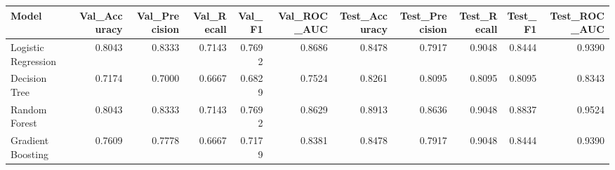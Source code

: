 \begin{tabular}{lrrrrrrrrrr}
\toprule
Model & Val_Accuracy & Val_Precision & Val_Recall & Val_F1 & Val_ROC_AUC & Test_Accuracy & Test_Precision & Test_Recall & Test_F1 & Test_ROC_AUC \\
\midrule
Logistic Regression & 0.8043 & 0.8333 & 0.7143 & 0.7692 & 0.8686 & 0.8478 & 0.7917 & 0.9048 & 0.8444 & 0.9390 \\
Decision Tree & 0.7174 & 0.7000 & 0.6667 & 0.6829 & 0.7524 & 0.8261 & 0.8095 & 0.8095 & 0.8095 & 0.8343 \\
Random Forest & 0.8043 & 0.8333 & 0.7143 & 0.7692 & 0.8629 & 0.8913 & 0.8636 & 0.9048 & 0.8837 & 0.9524 \\
Gradient Boosting & 0.7609 & 0.7778 & 0.6667 & 0.7179 & 0.8381 & 0.8478 & 0.7917 & 0.9048 & 0.8444 & 0.9390 \\
\bottomrule
\end{tabular}
